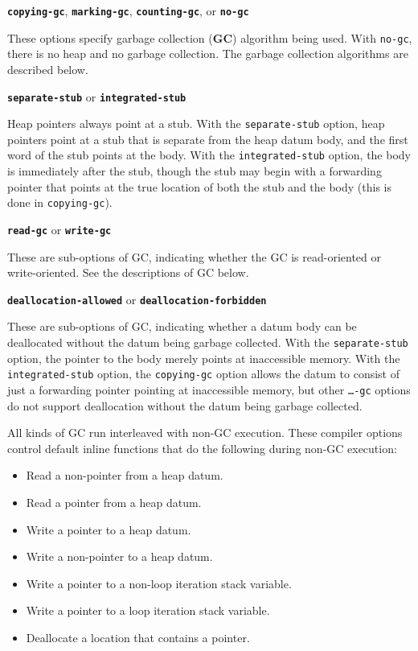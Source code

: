 \documentclass[12pt]{article}
\newcommand{\key}[1]{{\rm \bfseries #1}}
\newcommand{\ttkey}[1]{{\tt \bfseries #1}}
\newenvironment{indpar}[1][0.3in]%
	{\begin{list}{}%
		     {\setlength{\itemsep}{0in}%
		      \setlength{\topsep}{0in}%
		      \setlength{\parsep}{1ex}%
		      \setlength{\labelwidth}{#1}%
		      \setlength{\leftmargin}{#1}%
		      \addtolength{\leftmargin}{\labelsep}}%
	 \item}%
	{\end{list}}
\begin{document}
\begin{indpar}

\ttkey{copying-gc}, \ttkey{marking-gc}, \ttkey{counting-gc}, or \ttkey{no-gc}
\begin{indpar}
These options specify garbage collection (\key{GC})
algorithm being used.
With {\tt no-gc}, there is no heap and no garbage collection.
The garbage collection algorithms are described below.
\end{indpar}

\ttkey{separate-stub} or \ttkey{integrated-stub}
\begin{indpar}
Heap pointers always point at a stub.
With the {\tt separate-stub} option, heap pointers point at a stub that is
separate from the heap datum body, and the first word of the stub points at the
body.  With the {\tt integrated-stub} option,
the body is immediately after the
stub, though the stub may begin with a forwarding pointer
that points at the true location of both the stub and the body
(this is done in {\tt copying-gc}).
\end{indpar}

\ttkey{read-gc} or \ttkey{write-gc}
\begin{indpar}
These are sub-options of GC, indicating whether the GC is
read-oriented or write-oriented.  See the descriptions
of GC below.
\end{indpar}

\ttkey{deallocation-allowed} or \ttkey{deallocation-forbidden}
\begin{indpar}
These are sub-options of GC, indicating whether a datum body can be
deallocated without the datum being garbage collected.  With the
{\tt separate-stub} option, the pointer to the body merely points
at inaccessible memory.  With the {\tt integrated-stub} option, the
{\tt copying-gc} option allows the datum to consist of just a forwarding
pointer pointing at inaccessible memory, but other {\tt \ldots-gc}
options do not support deallocation without the datum being garbage collected.
\end{indpar}

\end{indpar}

All kinds of GC run interleaved with non-GC execution.
These compiler options control default inline functions that do the
following during non-GC execution:
\begin{itemize}
\item Read a non-pointer from a heap datum.
\item Read a pointer from a heap datum.
\item Write a pointer to a heap datum.
\item Write a non-pointer to a heap datum.
\item Write a pointer to a non-loop iteration stack variable.
\item Write a pointer to a loop iteration stack variable.
\item Deallocate a location that contains a pointer.
\end{itemize}
\end{document}
